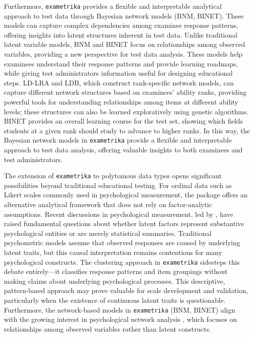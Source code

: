 Furthermore, \texttt{exametrika} provides a flexible and interpretable analytical approach to test data through Bayesian network models (BNM, BINET). These models can capture complex dependencies among examinee response patterns, offering insights into latent structures inherent in test data. Unlike traditional latent variable models, BNM and BINET focus on relationships among observed variables, providing a new perspective for test data analysis. These models help examinees understand their response patterns and provide learning roadmaps, while giving test administrators information useful for designing educational steps. LD-LRA and LDB, which construct rank-specific network models, can capture different network structures based on examinees' ability ranks, providing powerful tools for understanding relationships among items at different ability levels; these structures can also be learned exploratively using genetic algorithms. BINET provides an overall learning course for the test set, showing which fields students at a given rank should study to advance to higher ranks. In this way, the Bayesian network models in \texttt{exametrika} provide a flexible and interpretable approach to test data analysis, offering valuable insights to both examinees and test administrators.

The extension of \texttt{exametrika} to polytomous data types opens significant possibilities beyond traditional educational testing. For ordinal data such as Likert scales commonly used in psychological measurement, the package offers an alternative analytical framework that does not rely on factor-analytic assumptions. Recent discussions in psychological measurement, led by \citet{Borsboom2005}, have raised fundamental questions about whether latent factors represent substantive psychological entities or are merely statistical summaries. Traditional psychometric models assume that observed responses are caused by underlying latent traits, but this causal interpretation remains contentious for many psychological constructs. The clustering approach in \texttt{exametrika} sidesteps this debate entirely---it classifies response patterns and item groupings without making claims about underlying psychological processes. This descriptive, pattern-based approach may prove valuable for scale development and validation, particularly when the existence of continuous latent traits is questionable. Furthermore, the network-based models in \texttt{exametrika} (BNM, BINET) align with the growing interest in psychological network analysis \citep{Borsboom2005, Hood2009, Marsman2018}, which focuses on relationships among observed variables rather than latent constructs.

